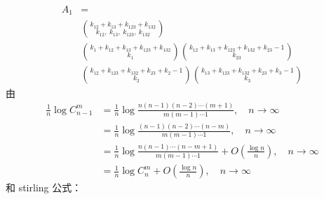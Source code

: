 \documentclass[cn,hazy,egreen,14pt,normal]{elegantnote}
\begin{document}
\begin{align*}
    A_1 &= \\ 
    &\binom{k_{12} + k_{13} + k_{123} +k_{132}}{k_{12}, ~k_{13}, ~k_{123}, ~k_{132}} \\
    & \binom{k_1 + k_{12} + k_{13} + k_{123} +k_{132}}{k_1}
    \binom{k_{12} +k_{13} + k_{123} +k_{132} + k_{23} - 1}{k_{23}} \\
    &\binom{k_{12} + k_{123} + k_{132} +k_{23} +k_2 -1}{k_2} \binom{k_{13} +k_{123} +k_{132} +k_{23} +k_3 -1}{k_3}
\end{align*}
由 
\begin{align*}
    \frac{1}{n} \log C_{n-1}^m &=  \frac{1}{n} \log \frac{n(n-1)(n-2)\cdots (m+1)}{m(m-1)\cdots 1}, \quad n\rightarrow \infty\\
    &= \frac{1}{n} \log \frac{(n-1)(n-2)\cdots (n-m)}{m(m-1)\cdots 1} , \quad n\rightarrow \infty\\
    &= \frac{1}{n} \log \frac{n(n-1)\cdots (n-m+1)}{m(m-1)\cdots 1} + O(\frac{\log n}{n}), \quad n\rightarrow \infty\\
    &= \frac{1}{n} \log C_n^m + O\left(\frac{\log n}{n}\right), \quad n\rightarrow \infty
\end{align*}
和 stirling 公式：
\end{document}

